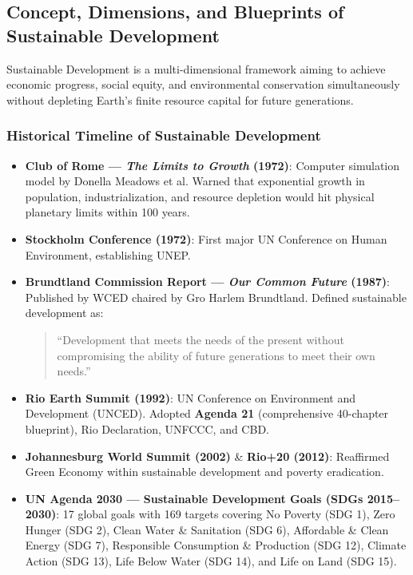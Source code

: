 \documentclass[11pt,a4paper]{article}
\begin{document}
\subsection{Concept, Dimensions, and Blueprints of Sustainable Development}

\begin{modelbox}
Sustainable Development is a multi-dimensional framework aiming to achieve economic progress, social equity, and environmental conservation simultaneously without depleting Earth's finite resource capital for future generations.
\end{modelbox}

\subsubsection{Historical Timeline of Sustainable Development}
\begin{itemize}[leftmargin=*]
  \item \textbf{Club of Rome --- \textit{The Limits to Growth} (1972)}: Computer simulation model by Donella Meadows et al. Warned that exponential growth in population, industrialization, and resource depletion would hit physical planetary limits within 100 years.
  \item \textbf{Stockholm Conference (1972)}: First major UN Conference on Human Environment, establishing UNEP.
  \item \textbf{Brundtland Commission Report --- \textit{Our Common Future} (1987)}: Published by WCED chaired by Gro Harlem Brundtland. Defined sustainable development as:
  \begin{quote}
    ``Development that meets the needs of the present without compromising the ability of future generations to meet their own needs.''
  \end{quote}
  \item \textbf{Rio Earth Summit (1992)}: UN Conference on Environment and Development (UNCED). Adopted \textbf{Agenda 21} (comprehensive 40-chapter blueprint), Rio Declaration, UNFCCC, and CBD.
  \item \textbf{Johannesburg World Summit (2002)} \& \textbf{Rio+20 (2012)}: Reaffirmed Green Economy within sustainable development and poverty eradication.
  \item \textbf{UN Agenda 2030 --- Sustainable Development Goals (SDGs 2015--2030)}: 17 global goals with 169 targets covering No Poverty (SDG 1), Zero Hunger (SDG 2), Clean Water \& Sanitation (SDG 6), Affordable \& Clean Energy (SDG 7), Responsible Consumption \& Production (SDG 12), Climate Action (SDG 13), Life Below Water (SDG 14), and Life on Land (SDG 15).
\end{itemize}
\end{document}
